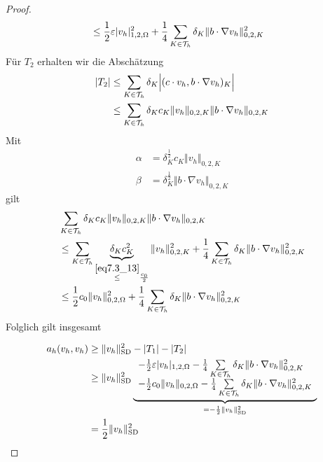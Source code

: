 \begin{proof}
\begin{align*}
		&\leq\frac{1}{2}\varepsilon|v_h|^2_{1,2,\Omega}+\frac{1}{4}\sum\limits_{K\in\mathcal{T}_h}\delta_K\Vert b\cdot\nabla v_h\Vert^2_{0,2,K}
	\end{align*}
	Für $T_2$ erhalten wir die Abschätzung
	\begin{align*}
		|T_2|
		&\leq\sum\limits_{K\in\mathcal{T}_h}\delta_K\Big|(c \cdot v_h,b\cdot\nabla v_h)_K\Big|\\
		&\leq\sum\limits_{K\in\mathcal{T}_h}\delta_K c_K\Vert v_h\Vert_{0,2,K}\Vert b\cdot\nabla v_h\Vert_{0,2,K}
	\end{align*}
	Mit
	\begin{align*}
		\alpha&=\delta_K^{\frac{1}{2}}c_K\Vert v_h\Vert_{0,2,K}\\
		\beta&=\delta_K^{\frac{1}{2}}\Vert b\cdot\nabla v_h\Vert_{0,2,K}
	\end{align*}
	gilt
	\begin{align*}
		&\sum\limits_{K\in\mathcal{T}_h}\delta_K c_K\Vert v_h\Vert_{0,2,K}\Vert b\cdot\nabla v_h\Vert_{0,2,K} \\
		&\leq\sum\limits_{K\in\mathcal{T}_h}\underbrace{\delta_K c_K^2}_{\overset{\eqref{eq7.3_13}}{\leq}\frac{c_0}{2}}\Vert v_h\Vert^2_{0,2,K}+\frac{1}{4}\sum\limits_{K\in\mathcal{T}_h}\delta_K\Vert b\cdot\nabla v_h\Vert^2_{0,2,K}\\
		&\leq\frac{1}{2}c_0\Vert v_h\Vert^2_{0,2,\Omega}+\frac{1}{4}\sum\limits_{K\in\mathcal{T}_h}\delta_K\Vert b\cdot\nabla v_h\Vert^2_{0,2,K}
	\end{align*}
	Folglich gilt insgesamt
 
	\begin{align*}
		a_h(v_h,v_h)
		&\geq\Vert v_h\Vert^2_{\text{SD}}-|T_1| -|T_2| \\
		&\geq\Vert v_h\Vert^2_{\text{SD}}\underbrace{
			\begin{array}{l}
				-\frac{1}{2}\varepsilon\vert v_h\vert_{1,2,\Omega}
			-\frac{1}{4}\sum\limits_{K\in\mathcal{T}_h}\delta_K\Vert b\cdot\nabla v_h\Vert^2_{0,2,K}\\
			-\frac{1}{2}c_0\Vert v_h\Vert_{0,2,\Omega}
			-\frac{1}{4}\sum\limits_{K\in\mathcal{T}_h}\delta_K\Vert b\cdot\nabla v_h\Vert^2_{0,2,K}
			\end{array}
			}_{=-\frac{1}{2}\Vert v_h\Vert_{\text{SD}}^2}\\
		&=\frac{1}{2}\Vert v_h\Vert^2_{\text{SD}}
	\end{align*}
\end{proof}

